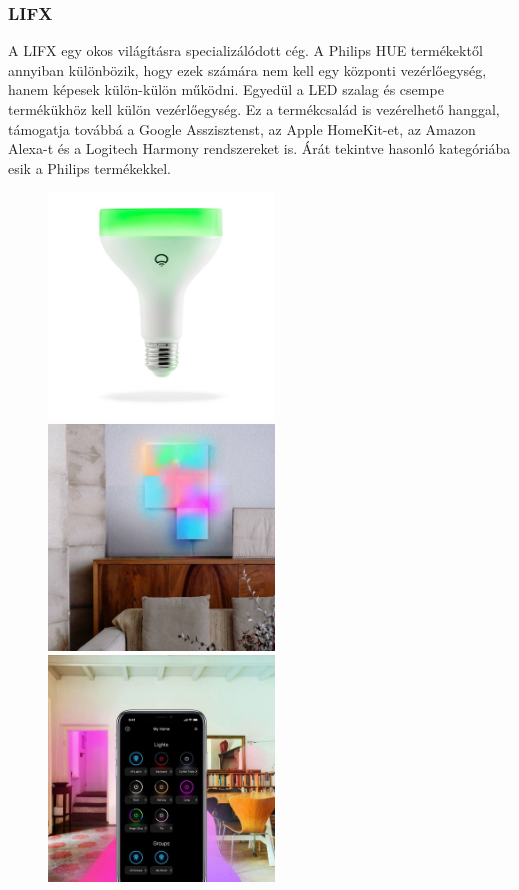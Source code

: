 \documentclass[../main.tex]{subfiles}
\begin{document}
            
            
       \subsubsection{LIFX}
            A LIFX egy okos világításra specializálódott cég. A Philips HUE termékektől annyiban különbözik, hogy ezek számára nem kell egy központi vezérlőegység, hanem képesek külön-külön működni. Egyedül a LED szalag és csempe termékükhöz kell külön vezérlőegység. Ez a termékcsalád is vezérelhető hanggal, támogatja továbbá a Google Asszisztenst, az Apple HomeKit-et, az Amazon Alexa-t és a Logitech Harmony rendszereket is. Árát tekintve hasonló kategóriába esik a Philips termékekkel. 
            
            \begin{figure}[h!]
                \centering
                    \includegraphics[height=6cm]{irodalom_res/LIFX_bulb}
                    \includegraphics[height=6cm]{irodalom_res/LIFX_tile}
                    \includegraphics[height=6cm]{irodalom_res/LIFX_app1}

\end{figure}
\end{document}
